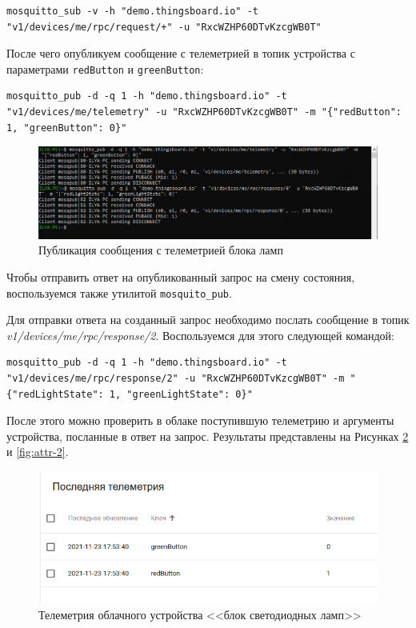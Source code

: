 \documentclass[a4paper,14pt]{extarticle}
\begin{document}
\begin{lstlisting}
mosquitto_sub -v -h "demo.thingsboard.io" -t "v1/devices/me/rpc/request/+" -u "RxcWZHP60DTvKzcgWB0T"
\end{lstlisting}

После чего опубликуем сообщение с телеметрией в топик устройства с параметрами
\texttt{redButton} и \texttt{greenButton}:

\begin{lstlisting}
mosquitto_pub -d -q 1 -h "demo.thingsboard.io" -t "v1/devices/me/telemetry" -u "RxcWZHP60DTvKzcgWB0T" -m "{"redButton": 1, "greenButton": 0}"
\end{lstlisting}

\begin{figure}[h!]
	\centering
	\includegraphics[width=0.6\linewidth]{images/t2-sender}
	\caption{Публикация сообщения с телеметрией блока ламп}
	\label{fig:t2-sender}
\end{figure}

Чтобы отправить ответ на опубликованный запрос на смену состояния, воспользуемся
также утилитой \texttt{mosquito\_pub}.

Для отправки ответа на созданный запрос необходимо послать сообщение в топик
\textit{v1/devices/me/rpc/response/2}. Воспользуемся для этого следующей командой:

\begin{lstlisting}
mosquitto_pub -d -q 1 -h "demo.thingsboard.io" -t "v1/devices/me/rpc/response/2" -u "RxcWZHP60DTvKzcgWB0T" -m "{"redLightState": 1, "greenLightState": 0}"
\end{lstlisting}

После этого можно проверить в облаке поступившую телеметрию и аргументы устройства,
посланные в ответ на запрос. Результаты представлены на Рисунках \ref{fig:tel-2} и \ref{fig:attr-2}.

\begin{figure}[h!]
	\centering
	\includegraphics[width=0.6\linewidth]{images/tel-2}
	\caption{Телеметрия облачного устройства <<блок светодиодных ламп>>}
	\label{fig:tel-2}
\end{figure}
\end{document}
